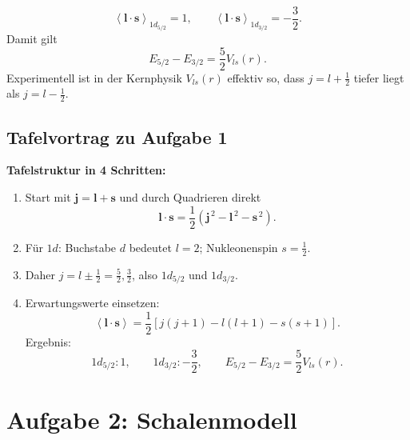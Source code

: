 \documentclass[11pt,a4paper]{scrartcl}
\newcommand{\avg}[1]{\left\langle #1 \right\rangle}
\newcommand{\paren}[1]{\left( #1 \right)}
\newcommand{\bracket}[1]{\left[ #1 \right]}
\newcommand{\vect}[1]{\bm{#1}}
\newcommand{\half}{\frac{1}{2}}
\theoremstyle{definition}
\theoremstyle{plain}
\theoremstyle{remark}
\begin{document}
\begin{enumerate}[label=(\alph*)]
    \begin{answerbox}
        \[
            \boxed{\avg{\vect{l}\cdot\vect{s}}_{1d_{5/2}}=1},
            \qquad
            \boxed{\avg{\vect{l}\cdot\vect{s}}_{1d_{3/2}}=-\frac{3}{2}}.
        \]
        Damit gilt
        \[
            \boxed{E_{5/2}-E_{3/2}=\frac{5}{2}V_{ls}(r)}.
        \]
        Experimentell ist in der Kernphysik $V_{ls}(r)$ effektiv so, dass $j=l+\half$ tiefer liegt als $j=l-\half$.
    \end{answerbox}
\end{enumerate}

\subsection{Tafelvortrag zu Aufgabe 1}

\begin{talkbox}
\textbf{Tafelstruktur in 4 Schritten:}
\begin{enumerate}
    \item Start mit $\vect{j}=\vect{l}+\vect{s}$ und durch Quadrieren direkt
    \[
        \vect{l}\cdot\vect{s}=\half\paren{\vect{j}^{\,2}-\vect{l}^{\,2}-\vect{s}^{\,2}}.
    \]
    \item F\"ur $1d$: Buchstabe $d$ bedeutet $l=2$; Nukleonenspin $s=\half$.
    \item Daher $j=l\pm\half=\frac{5}{2},\frac{3}{2}$, also $1d_{5/2}$ und $1d_{3/2}$.
    \item Erwartungswerte einsetzen:
    \[
        \avg{\vect{l}\cdot\vect{s}}
        =\half\bracket{j(j+1)-l(l+1)-s(s+1)}.
    \]
    Ergebnis:
    \[
        1d_{5/2}: 1,
        \qquad
        1d_{3/2}: -\frac{3}{2},
        \qquad
        E_{5/2}-E_{3/2}=\frac{5}{2}V_{ls}(r).
    \]
\end{enumerate}
\end{talkbox}

\FloatBarrier
\newpage

\section{Aufgabe 2: Schalenmodell}
\end{document}
